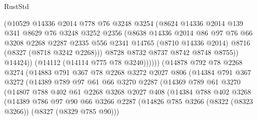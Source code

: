 \begin{lexlean}{RustStd}
\begin{coremodule}
{\begin{coremodule}
{{{{{{{{{{{{{{{{{{{{{{{{{{{{{{{{{{{{{{{{{{{{{{{{{{{{{{                      (@10529
                        @14336
                        @2014
                        @778
                        @76
                        @3248
                        @3254
                        (@8624
                          @14336
                          @2014
                          @139
                          @341
                          @8629
                          @76
                          @3248
                          @3252
                          @2356
                          (@8638
                            @14336
                            @2014
                            @86
                            @97
                            @76
                            @66
                            @3208
                            @2268
                            @2287
                            @2335
                            @556
                            @2341
                            @14765
                            (@8710 @14336 @2014)
                            @8716
                            (@8327 (@8718 @3242 @2268)))
                          @8728
                          @8732
                          @8737
                          @8742
                          @8748
                          @8755))
                      @14424))
                  (@14112 (@14114 @775 @78 @3240))))))
          (@14878
            @792
            @78
            @2268
            @3274
            (@14883
              @791
              @367
              @78
              @2268
              @3272
              @2027
              @806
              (@14384
                @791
                @367
                @3272
                (@14389
                  @789
                  @97
                  @61
                  @66
                  @3270
                  @2287
                  (@14369
                    @789
                    @61
                    @3270
                    (@14807
                      @788
                      @402
                      @61
                      @2268
                      @3268
                      @2027
                      @408
                      (@14384
                        @788
                        @402
                        @3268
                        (@14389
                          @786
                          @97
                          @90
                          @66
                          @3266
                          @2287
                          (@14826 @785 @3266 (@8322 (@8323 @3266)) (@8327 (@8329 @785 @90)))
}}}}}}}}}}}}}}}}}}}}}}}}}}}}}}}}}}}}}}}}}}}}}}}}}}}}}}
\end{coremodule}}
\end{coremodule}
\end{lexlean}
